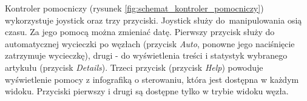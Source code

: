 
Kontroler pomocniczy (rysunek \ref{fig:schemat_kontroler_pomocniczy}) wykorzystuje joystick oraz trzy przyciski. Joystick służy do~manipulowania osią czasu. Za jego pomocą można zmieniać datę. Pierwszy przycisk służy do automatycznej wycieczki po węzłach (przycisk \textit{Auto}, ponowne jego naciśnięcie zatrzymuje wycieczkę), drugi - do wyświetlenia treści i statystyk wybranego artykułu (przycisk \textit{Details}). Trzeci przycisk (przycisk \textit{Help}) powoduje wyświetlenie pomocy z infografiką o sterowaniu, która jest dostępna w każdym widoku. Przyciski pierwszy i drugi są dostępne tylko w trybie widoku węzła.

\newpage
